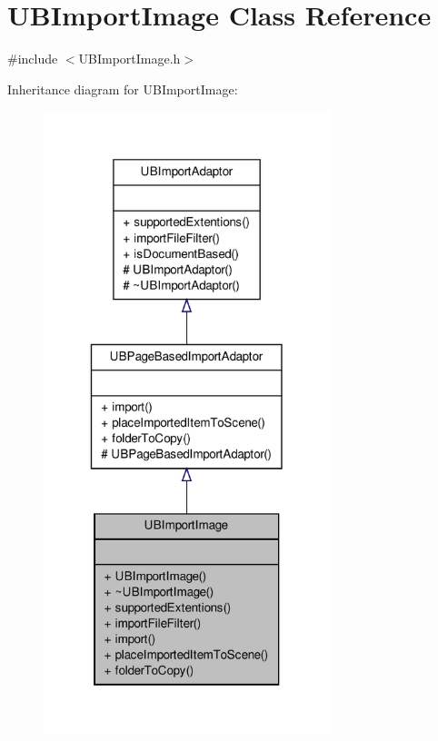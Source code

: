 \hypertarget{class_u_b_import_image}{\section{U\-B\-Import\-Image Class Reference}
\label{d1/d23/class_u_b_import_image}
}


{\ttfamily \#include $<$U\-B\-Import\-Image.\-h$>$}



Inheritance diagram for U\-B\-Import\-Image\-:
\nopagebreak
\begin{figure}[H]
\begin{center}
\leavevmode
\includegraphics[width=236pt]{d7/d70/class_u_b_import_image__inherit__graph}
\end{center}
\end{figure}


